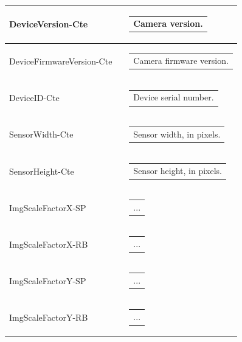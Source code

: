 \documentclass[openany]{article}
\begin{document}
\begin{longtable}{| m{3.0cm} m{4.5cm} m{7.0cm} |}
        DeviceVersion-Cte &  & \begin{tabular}{@{}m{6cm}@{}}
                Camera version.
            \end{tabular} \hypertarget{pv:firmware-version}{}\\ \hline
        DeviceFirmwareVersion-Cte &  & \begin{tabular}{@{}m{6cm}@{}}
                Camera firmware version.
            \end{tabular} \hypertarget{pv:device-id}{}\\ \hline
        DeviceID-Cte &  & \begin{tabular}{@{}m{6cm}@{}}
                Device serial number.
            \end{tabular} \hypertarget{pv:sensor-width}{}\\ \hline
        SensorWidth-Cte &  & \begin{tabular}{@{}m{6cm}@{}}
                Sensor width, in pixels.
            \end{tabular} \hypertarget{pv:sensor-height}{}\\ \hline
        SensorHeight-Cte &  & \begin{tabular}{@{}m{6cm}@{}}
                Sensor height, in pixels.
            \end{tabular} \hypertarget{}{}\\ \hline
        ImgScaleFactorX-SP &  & \begin{tabular}{@{}m{6cm}@{}}
                ...
            \end{tabular} \\ \hline
        ImgScaleFactorX-RB &  & \begin{tabular}{@{}m{6cm}@{}}
                ...
            \end{tabular} \hypertarget{}{}\\ \hline
        ImgScaleFactorY-SP &  & \begin{tabular}{@{}m{6cm}@{}}
                ...
            \end{tabular} \\ \hline
        ImgScaleFactorY-RB &  & \begin{tabular}{@{}m{6cm}@{}}
                ...
            \end{tabular} \hypertarget{}{}\\ \hline

\end{longtable}
\end{document}
